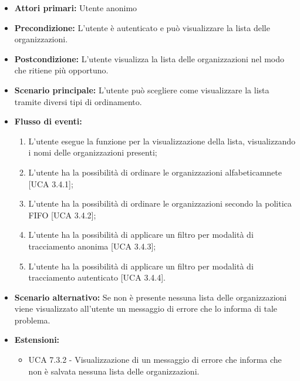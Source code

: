 \begin{itemize} 
	\item \textbf{Attori primari:} Utente anonimo
	\item \textbf{Precondizione:}  L'utente è autenticato e può visualizzare la lista delle organizzazioni.
	\item \textbf{Postcondizione:} L'utente visualizza la lista delle organizzazioni nel modo che ritiene più opportuno.
	\item \textbf{Scenario principale:}	L'utente può scegliere come visualizzare la lista tramite diversi tipi di ordinamento.
	\item \textbf{Flusso di eventi:}
	\begin{enumerate}
		\item L'utente esegue la funzione per la visualizzazione della lista, visualizzando i nomi delle organizzazioni presenti;
		\item L'utente ha la possibilità di ordinare le organizzazioni alfabeticamnete [UCA 3.4.1];
		\item L'utente ha la possibilità di ordinare le organizzazioni secondo la politica FIFO [UCA 3.4.2];
		\item L'utente ha la possibilità di applicare un filtro per modalità di tracciamento anonima [UCA 3.4.3];
		\item L'utente ha la possibilità di applicare un filtro per modalità di tracciamento autenticato [UCA 3.4.4].
	\end{enumerate}
	\item \textbf{Scenario alternativo:} Se non è presente nessuna lista delle organizzazioni viene visualizzato all'utente un messaggio di errore che lo informa di tale problema.
	\item \textbf{Estensioni:}
	\begin{itemize}
		\item UCA 7.3.2 - Visualizzazione di un messaggio di errore che informa che non è salvata nessuna lista delle organizzazioni.
	\end{itemize}
\end{itemize}

